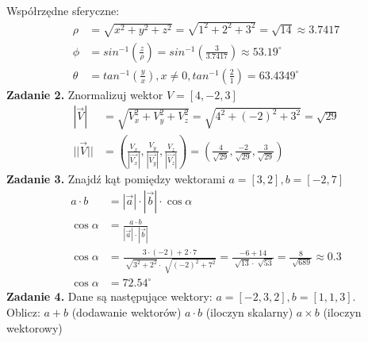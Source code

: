 \documentclass[a4paper]{article}
\begin{document}
\noindent\textnormal{Współrzędne sferyczne:}
\begin{align*}
\rho &= \sqrt{x^2 + y^2 + z^2} = \sqrt{1^2 + 2^2 + 3^2} = \sqrt{14} \approx 3.7417\\
\phi &= sin^{-1}\left(\frac{z}{\rho}\right) = sin^{-1}\left(\frac{3}{3.7417}\right) \approx 53.19^{\circ} \\
\theta &= tan^{-1}\left(\frac{y}{x}\right) , x \ne 0 , tan^{-1}\left(\frac{2}{1}\right) = 63.4349^{\circ}
\end{align*}
\noindent\textbf{Zadanie 2.}
\textnormal{Znormalizuj wektor $V = [4, -2, 3]$}
\begin{align*}
|\vec{V}| &= \sqrt{V^2_x + V^2_y +V^2_z} = \sqrt{4^2 + (-2)^2 + 3^2} = \sqrt{29}\\
||\vec{V}|| & = \left(\frac{V_x}{|\vec{V_x}|} , \frac{V_y}{|\vec{V_y}|} , \frac{V_z}{|\vec{V_z}|}\right) = \left(\frac{4}{\sqrt{29}} , \frac{-2}{\sqrt{29}} , \frac{3}{\sqrt{29}}\right)
\end{align*}
\noindent\textbf{Zadanie 3.}
\textnormal{Znajdź kąt pomiędzy wektorami $a=[3, 2], b=[-2, 7]$}
\begin{align*}
a \cdot b &= \left|\vec{a}\right| \cdot |\vec{b}| \cdot \cos\alpha\\
\cos\alpha &= \frac{a \cdot b }{\left|\vec{a}\right| \cdot |\vec{b}|}\\
\cos\alpha &= \frac{3\cdot (-2) + 2 \cdot 7}{\sqrt[]{3^2 + 2^2} \cdot \sqrt[]{(-2)^2 +7^2}} = \frac{-6 + 14}{\sqrt[]{13} \cdot\sqrt[]{53}} = \frac{8}{\sqrt[]{689}} \approx 0.3 \\
\cos\alpha &= 72.54^{\circ}
\end{align*}
\noindent\textbf{Zadanie 4.}
\textnormal{Dane są następujące wektory: $a=[-2, 3, 2], b=[1, 1, 3]$. \\Oblicz: $ a + b$ (dodawanie wektorów) $a \cdot b$ (iloczyn skalarny) $a \times b$ (iloczyn wektorowy)}
\end{document}

